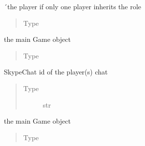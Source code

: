\documentclass[letterpaper,10pt,english]{sphinxmanual}
\begin{document}
\begin{fulllineitems}
\begin{fulllineitems}
\end{fulllineitems}



\begin{fulllineitems}
´the player if only one player inherits the role
\begin{quote}\begin{description}
\item[{Type}] \leavevmode
{\hyperref[\detokenize{chatwolf:chatwolf.player.Player}]{}}

\end{description}\end{quote}

\end{fulllineitems}



\begin{fulllineitems}
the main Game object
\begin{quote}\begin{description}
\item[{Type}] \leavevmode
{\hyperref[\detokenize{chatwolf:chatwolf.game.Game}]{}}

\end{description}\end{quote}

\end{fulllineitems}



\begin{fulllineitems}
SkypeChat id of the player(s) chat
\begin{quote}\begin{description}
\item[{Type}] \leavevmode
str

\end{description}\end{quote}

\end{fulllineitems}



\begin{fulllineitems}
the main Game object
\begin{quote}\begin{description}
\item[{Type}] \leavevmode
{\hyperref[\detokenize{chatwolf:chatwolf.game.Game}]{}}


\end{description}
\end{quote}
\end{fulllineitems}
\end{fulllineitems}
\end{document}
